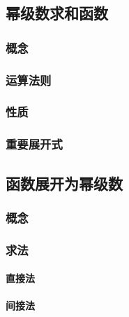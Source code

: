 \documentclass[UTF8, 12pt]{ctexart}
\begin{document}
\subsection{幂级数求和函数}

\subsubsection{概念}

\subsubsection{运算法则}

\subsubsection{性质}

\subsubsection{重要展开式}

\subsection{函数展开为幂级数}

\subsubsection{概念}

\subsubsection{求法}

\paragraph{直接法} \leavevmode \medskip

\paragraph{间接法} \leavevmode \medskip
\end{document}
